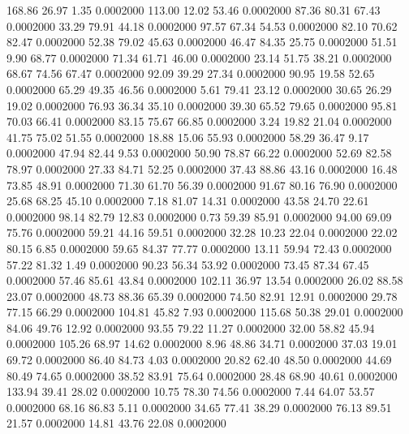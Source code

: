  168.86   26.97    1.35   0.0002000
 113.00   12.02   53.46   0.0002000
  87.36   80.31   67.43   0.0002000
  33.29   79.91   44.18   0.0002000
  97.57   67.34   54.53   0.0002000
  82.10   70.62   82.47   0.0002000
  52.38   79.02   45.63   0.0002000
  46.47   84.35   25.75   0.0002000
  51.51    9.90   68.77   0.0002000
  71.34   61.71   46.00   0.0002000
  23.14   51.75   38.21   0.0002000
  68.67   74.56   67.47   0.0002000
  92.09   39.29   27.34   0.0002000
  90.95   19.58   52.65   0.0002000
  65.29   49.35   46.56   0.0002000
   5.61   79.41   23.12   0.0002000
  30.65   26.29   19.02   0.0002000
  76.93   36.34   35.10   0.0002000
  39.30   65.52   79.65   0.0002000
  95.81   70.03   66.41   0.0002000
  83.15   75.67   66.85   0.0002000
   3.24   19.82   21.04   0.0002000
  41.75   75.02   51.55   0.0002000
  18.88   15.06   55.93   0.0002000
  58.29   36.47    9.17   0.0002000
  47.94   82.44    9.53   0.0002000
  50.90   78.87   66.22   0.0002000
  52.69   82.58   78.97   0.0002000
  27.33   84.71   52.25   0.0002000
  37.43   88.86   43.16   0.0002000
  16.48   73.85   48.91   0.0002000
  71.30   61.70   56.39   0.0002000
  91.67   80.16   76.90   0.0002000
  25.68   68.25   45.10   0.0002000
   7.18   81.07   14.31   0.0002000
  43.58   24.70   22.61   0.0002000
  98.14   82.79   12.83   0.0002000
   0.73   59.39   85.91   0.0002000
  94.00   69.09   75.76   0.0002000
  59.21   44.16   59.51   0.0002000
  32.28   10.23   22.04   0.0002000
  22.02   80.15    6.85   0.0002000
  59.65   84.37   77.77   0.0002000
  13.11   59.94   72.43   0.0002000
  57.22   81.32    1.49   0.0002000
  90.23   56.34   53.92   0.0002000
  73.45   87.34   67.45   0.0002000
  57.46   85.61   43.84   0.0002000
 102.11   36.97   13.54   0.0002000
  26.02   88.58   23.07   0.0002000
  48.73   88.36   65.39   0.0002000
  74.50   82.91   12.91   0.0002000
  29.78   77.15   66.29   0.0002000
 104.81   45.82    7.93   0.0002000
 115.68   50.38   29.01   0.0002000
  84.06   49.76   12.92   0.0002000
  93.55   79.22   11.27   0.0002000
  32.00   58.82   45.94   0.0002000
 105.26   68.97   14.62   0.0002000
   8.96   48.86   34.71   0.0002000
  37.03   19.01   69.72   0.0002000
  86.40   84.73    4.03   0.0002000
  20.82   62.40   48.50   0.0002000
  44.69   80.49   74.65   0.0002000
  38.52   83.91   75.64   0.0002000
  28.48   68.90   40.61   0.0002000
 133.94   39.41   28.02   0.0002000
  10.75   78.30   74.56   0.0002000
   7.44   64.07   53.57   0.0002000
  68.16   86.83    5.11   0.0002000
  34.65   77.41   38.29   0.0002000
  76.13   89.51   21.57   0.0002000
  14.81   43.76   22.08   0.0002000
